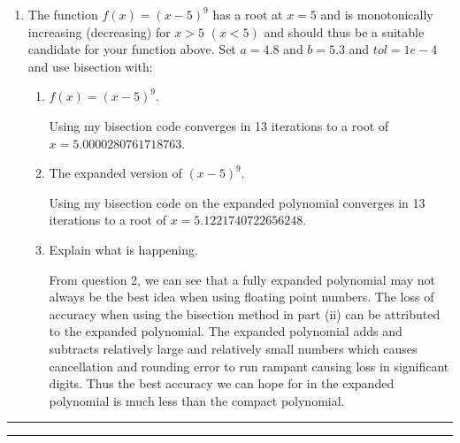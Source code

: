 \documentclass[a4paper,10pt]{article}
\newcommand{\abs}[1]{\left| #1 \right|}
\begin{document}
\begin{enumerate}[label = \arabic*.)]
            Suppose we have any $ \varepsilon > 0 $ and $ x \in [0, \varepsilon) $. Then
            \[
                \abs{\frac{x \sin(x) \sqrt{x}}{x^{3/2}}} = \abs{\frac{x^{3/2} \sin(x)}{x^{3/2}}} = \abs{\sin(x)} \leq 1 = M.
            \]
            Therefore, $ x \sin (\sqrt{x}) = O(x^{3/2}) $ as $ x \to 0^+ $.
            
            \item The function $f(x) = (x - 5)^9$ has a root at $x = 5$ and is monotonically increasing (decreasing) for $x > 5$ $(x < 5)$ and should thus be a suitable candidate for your function above. Set $a = 4.8$ and $b = 5.3$ and $tol = 1e-4$ and use bisection with:
                \begin{enumerate}[label = \roman*.]
                    \item $f(x) = (x - 5)^9$.
                    
                    Using my bisection code converges in 13 iterations to a root of $ x = 5.0000280761718763 $.
                    
                    \item The expanded version of $(x - 5)^9$.
                    
                    Using my bisection code on the expanded  polynomial converges in 13 iterations to a root of $ x = 5.1221740722656248 $.
                    
                    \item Explain what is happening.
                    
                    From question 2, we can see that a fully expanded polynomial may not always be the best idea when using floating point numbers. The loss of accuracy when using the bisection method in part (ii) can be attributed to the expanded polynomial. The expanded polynomial adds and subtracts relatively large and relatively small numbers which causes cancellation and rounding error to run rampant causing loss in significant digits. Thus the best accuracy we can hope for in the expanded polynomial is much less than the compact polynomial.
                \end{enumerate} 
\end{enumerate}

\newpage
\rule{\textwidth}{0.4pt}

\rule{\textwidth}{0.4pt}
\end{document}
